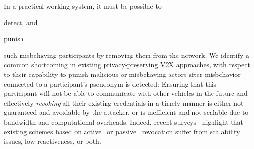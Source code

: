 In a practical working system, it must be possible to 
\begin{paraenum}
    \item detect, and
    \item punish 
\end{paraenum}
such misbehaving participants by removing them from the network.
%
We identify a common shortcoming in existing privacy-preserving \ac{V2X}
approaches, with respect to their capability to punish malicious or misbehaving
actors after misbehavior connected to a participant's pseudonym is detected:
Ensuring that this participant will not be able to communicate with other
vehicles in the future and effectively \emph{revoking} all their existing
credentials in a timely manner is either not guaranteed and avoidable by the
attacker, or is inefficient and not scalable due to bandwidth and computational
overheads. Indeed, recent
surveys~\cite{yoshizawa2022v2x_survey,wang2020certificate} highlight that
existing schemes based on active~\cite{brecht2018scms} or
passive~\cite{etsi2022102941} revocation suffer from scalability issues, low
reactiveness, or both.


